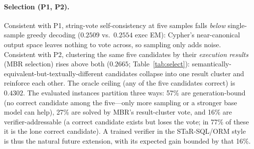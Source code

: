 \documentclass[11pt]{article}
\begin{document}
\paragraph{Selection (P1, P2).} Consistent with P1, string-vote self-consistency at five samples
falls \emph{below} single-sample greedy decoding ($0.2509$ vs.\ $0.2554$ exec EM): Cypher's
near-canonical output space leaves nothing to vote across, so sampling only adds noise. Consistent
with P2, clustering the same five candidates by their \emph{execution results} (MBR selection) rises
above both ($0.2665$; Table~\ref{tab:select}): semantically-equivalent-but-textually-different
candidates collapse into one result cluster and reinforce each other. The oracle ceiling (any of the
five candidates correct) is $0.4302$. The evaluated instances partition three ways: 57\% are
generation-bound (no correct candidate among the five---only more sampling or a stronger base model
can help), 27\% are solved by MBR's result-cluster vote, and 16\% are verifier-addressable (a correct
candidate exists but loses the vote; in 77\% of these it is the lone correct candidate). A trained
verifier in the STaR-SQL/ORM style is thus the natural future extension, with its expected gain
bounded by that 16\%.
\end{document}
